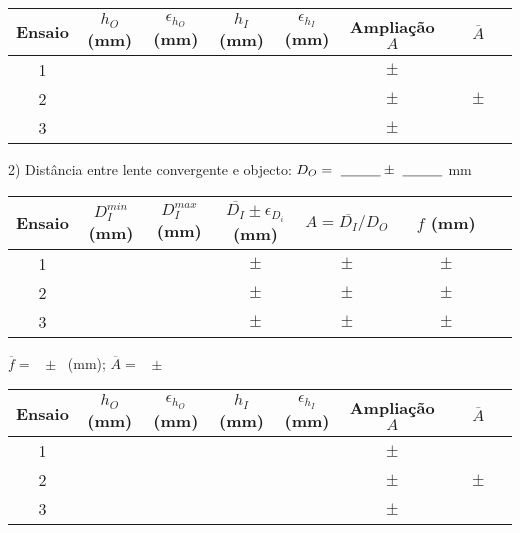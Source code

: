 \documentclass[a4paper,12pt]{article}  %
\begin{document}
\begin{center}
	\begin{tabular}{|c|c|c|c|c|c|c|}
	\hline
	 Ensaio &
	  $h_O$ (mm) & 
	  $\epsilon_{h_O}$ (mm) & 
	  $h_I$ (mm) & 
	  $\epsilon_{h_I}$ (mm) & 
	  Ampliação $A$ &
  	  $\overline{A}$\\
	\hline \hline
	1 & & & & & $\quad \pm \quad$  & \makebox[2cm][r]{}  \\ \cline{1-6}
	2 & & & & & $\quad \pm \quad$ & $\quad \pm \quad$\\ \cline{1-6}
	3 & & & & & $\quad \pm \quad$ & \\  \hline
			\end{tabular}
\end{center}

2) Distância entre lente convergente e objecto: $D_O=~\underline{\makebox[1cm][r]{~}}\pm~\underline{\makebox[1cm][r]{~}}$ mm

\begin{center}
	\begin{tabular}{|c|c|c|c|c|c|c|}
	\hline
	 Ensaio &
	  $ D_{I}^{min}$ (mm) & 
	  $ D_I^{max}$ (mm) & 
	  $ \overline{D_{I}}\pm\epsilon_{D_i}$ (mm) &
	  $A=\overline{D_I}/D_O$ &
	  $f$ (mm) \\
	\hline \hline
	1 & & &  $\quad \pm \quad$ & $\quad \pm \quad$& $\qquad \pm \qquad$ \\ \cline{1-6}
	2 & & & $\quad \pm \quad$ & $\quad \pm \quad$& $\quad \pm \quad$  \\ \cline{1-6}
	3 & & & $\quad \pm \quad$ & $\quad \pm \quad$& $\quad \pm \quad$ \\ \hline
	  \end{tabular}
\end{center}
 $\overline{f} =$ ~\underline{\makebox[1cm][r]{~}}$\pm$~\underline{\makebox[1cm][r]{~}} (mm);  $\overline{A} =$ ~\underline{\makebox[1cm][r]{~}}$\pm$~\underline{\makebox[1cm][r]{~}}

\begin{center}
	\begin{tabular}{|c|c|c|c|c|c|c|}
	\hline
	 Ensaio &
	  $h_O$ (mm) & 
	  $\epsilon_{h_O}$ (mm) & 
	  $h_I$ (mm) & 
	  $\epsilon_{h_I}$ (mm) & 
	  Ampliação $A$ &
  	  $\overline{A}$\\
	\hline \hline
	1 & & & & & $\quad \pm \quad$  & \makebox[2cm][r]{}  \\ \cline{1-6}
	2 & & & & & $\quad \pm \quad$ & $\quad \pm \quad$\\ \cline{1-6}
	3 & & & & & $\quad \pm \quad$ & \\  \hline
			\end{tabular}
\end{center}
\end{document}
